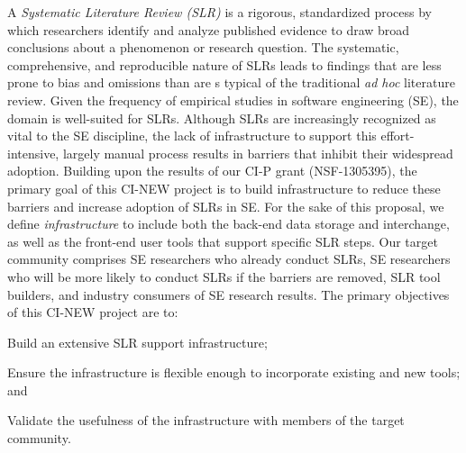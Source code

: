 A \textit{Systematic Literature Review (SLR)} is a rigorous, standardized process by which researchers identify and analyze published evidence to draw broad conclusions about a phenomenon or research question.
The systematic, comprehensive, and reproducible nature of SLRs leads to findings that are less prone to bias and omissions than are s typical of the traditional \textit{ad hoc} literature review.
Given the frequency of empirical studies in software engineering (SE), the domain is well-suited for SLRs.
Although SLRs are increasingly recognized as vital to the SE discipline, the lack of infrastructure to support this effort-intensive, largely manual process results in barriers that inhibit their widespread adoption.
Building upon the results of our CI-P grant (NSF-1305395), the primary goal of this CI-NEW project is to build infrastructure to reduce these barriers and increase adoption of SLRs in SE.
For the sake of this proposal, we define \textit{infrastructure} to include both the back-end data storage and interchange, as well as the front-end user tools that support specific SLR steps.
Our target community comprises SE researchers who already conduct SLRs, SE researchers who will be more likely to conduct SLRs if the barriers are removed, SLR tool builders, and industry consumers of SE research results. 
The primary objectives of this CI-NEW project are to: 
\begin{itemize*}
	\vspace{-6pt}
	\item Build an extensive SLR support infrastructure;
	\item Ensure the infrastructure is flexible enough to incorporate existing and new tools; and
	\item Validate the usefulness of the infrastructure with members of the target community.
\end{itemize*}
\vspace*{-4pt }
